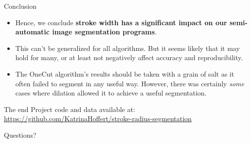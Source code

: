 \documentclass[14pt,xcolor=dvipsnames]{beamer}
\begin{document}
\begin{frame}[fragile,t]{Conclusion}
	\begin{itemize}
		\item Hence, we conclude \textbf{stroke width has a significant impact on our semi-automatic image segmentation programs}.
		\item This can't be generalized for all algorithms. But it seems likely that it may hold for many, or at least not negatively affect accuracy and reproducibility.
		\item The OneCut algorithm's results should be taken with a grain of salt as it often failed to segment in any useful way. However, there was certainly \textit{some} cases where dilation allowed it to achieve a useful segmentation.
	\end{itemize}
\end{frame}

\begin{frame}[fragile,t]{The end}
	Project code and data available at:\\ \footnotesize{\url{https://github.com/KatrinaHoffert/stroke-radius-segmentation}}
	
	\vspace{4em}
	
	\begin{center}
		\huge{Questions?}
	\end{center}
\end{frame}
\end{document}

